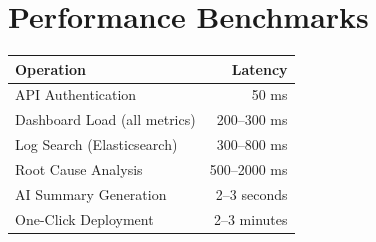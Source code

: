 \documentclass[12pt,a4paper]{report}
\begin{document}
\section{Performance Benchmarks}

\begin{center}
\begin{tabular}{|l|r|}
  \hline
  \textbf{Operation} & \textbf{Latency} \\
  \hline
  API Authentication & 50 ms \\
  Dashboard Load (all metrics) & 200–300 ms \\
  Log Search (Elasticsearch) & 300–800 ms \\
  Root Cause Analysis & 500–2000 ms \\
  AI Summary Generation & 2–3 seconds \\
  One-Click Deployment & 2–3 minutes \\
  \hline
\end{tabular}
\end{center}
\end{document}
